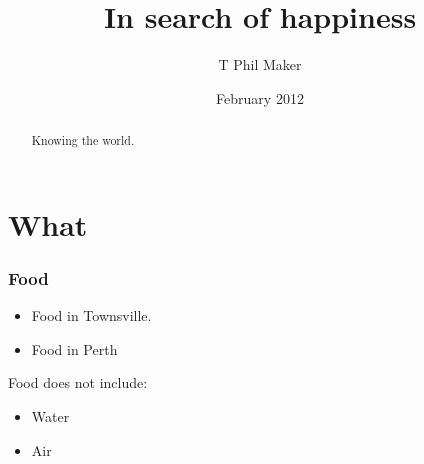 \documentclass{beamer}
\title{In search of happiness}
\author{T Phil Maker}
\institute{}
\date{February 2012}
\begin{document}
\begin{frame}
  \maketitle
  \vspace{-1.2cm}
  \begin{abstract}
    \small Knowing the world.
  \end{abstract}
\end{frame}

\section{What}
\begin{frame}\frametitle{Food}
\begin{itemize}
\item Food in Townsville.
\item Food in Perth
\end{itemize}
\pause

Food does not include:
\begin{itemize}
\item Water
\item Air
\end{itemize}
\end{frame}
\end{document}
